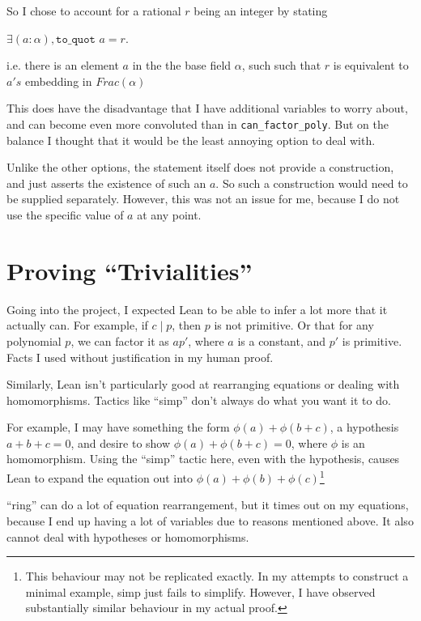 \documentclass[pagesize=a4]{scrreprt}
\begin{document}
    So I chose to account for a rational $r$ being an integer by stating 

    $\exists(a : \alpha), \texttt{to\_quot } a = r$. 

    i.e. there is an element $a$ in the the base field $\alpha$, such such that $r$ is equivalent to $a's$ embedding in $Frac(\alpha)$

    This does have the disadvantage that I have additional variables to worry about, and can become even more convoluted than in \texttt{can\_factor\_poly}. But on the balance I thought that it would be the least annoying option to deal with. 

    Unlike the other options, the statement itself does not provide a construction, and just asserts the existence of such an $a$. So such a construction would need to be supplied separately. However, this was not an issue for me, because I do not use the specific value of $a$ at any point. 

\section{Proving ``Trivialities''}

Going into the project, I expected Lean to be able to infer a lot more that it actually can. For example, if $c \mid p$, then $p$ is not primitive. Or that for any polynomial $p$, we can factor it as $ap'$, where $a$ is a constant, and $p'$ is primitive. Facts I used without justification in my human proof.  

Similarly, Lean isn't particularly good at rearranging equations or dealing with homomorphisms. Tactics like ``simp'' don't always do what you want it to do. 

For example, I may have something the form $\phi(a) + \phi(b + c)$, a hypothesis $a + b + c = 0$, and desire to show $\phi(a) + \phi(b+c) = 0$, where $\phi$ is an homomorphism. Using the ``simp'' tactic here, even with the hypothesis, causes Lean to expand the equation out into $\phi(a) + \phi(b) + \phi(c)$\footnote{This behaviour may not be replicated exactly. In my attempts to construct a minimal example, simp just fails to simplify. However, I have observed substantially similar behaviour in my actual proof.}

``ring'' can do a lot of equation rearrangement, but it times out on my equations, because I end up having a lot of variables due to reasons mentioned above. It also cannot deal with hypotheses or homomorphisms. 
\end{document}

